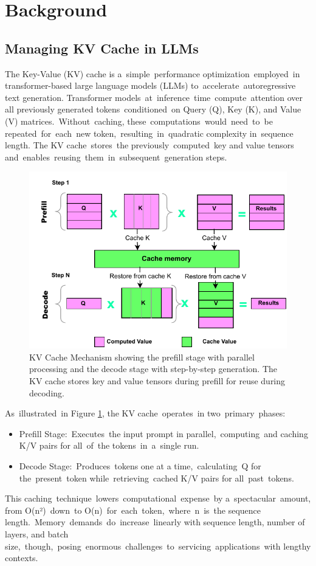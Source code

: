 \documentclass[sigconf,nonacm]{acmart}
\begin{document}
\section {Background}
\subsection{Managing KV Cache in LLMs}
\label{sec:subsection}
The Key-Value (KV) cache is a simple performance optimization employed in transformer-based large language models (LLMs) to accelerate autoregressive text generation. Transformer models at inference time compute attention over all previously generated tokens conditioned on Query (Q), Key (K), and Value (V) matrices. Without caching, these computations would need to be repeated for each new token, resulting in quadratic complexity in sequence length. The KV cache stores the previously computed key and value tensors and enables reusing them in subsequent generation steps.

\begin{figure}[h]
\centering
 \includegraphics[scale=0.77]
 {KVCache.pdf}
\caption{KV Cache Mechanism showing the prefill stage with parallel processing and the decode stage with step-by-step generation. The KV cache stores key and value tensors during prefill for reuse during decoding.}
\label{fig:kv_cache_mechanism}
\end{figure}


As illustrated in Figure \ref{fig:kv_cache_mechanism}, the KV cache operates in two primary phases:
\begin{itemize}[leftmargin=*, topsep=1ex, partopsep=0pt, itemsep=0pt, parsep=0pt]
\item Prefill Stage: Executes the input prompt in parallel, computing and caching K/V pairs for all of the tokens in a single run.
\item Decode Stage: Produces tokens one at a time, calculating Q for the present token while retrieving cached K/V pairs for all past tokens.
\end{itemize}
This caching technique lowers computational expense by a spectacular amount, from O(n²) down to O(n) for each token, where n is the sequence length. Memory demands do increase linearly with sequence length, number of layers, and batch size, though, posing enormous challenges to servicing applications with lengthy contexts.
\end{document}
